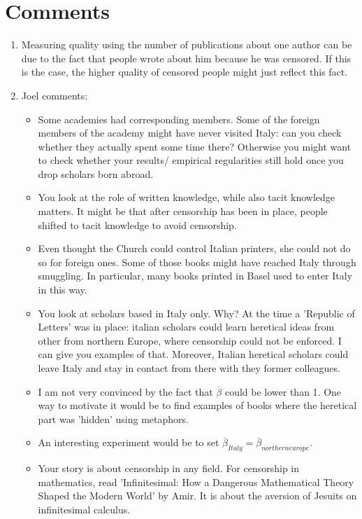 \section{Comments}
\begin{enumerate}
	\item Measuring quality using the number of publications about one author can be due to the fact that people wrote about him because he was censored. If this is the case, the higher quality of censored people might just reflect this fact.
	\item Joel comments:
	
	\begin{itemize}
		
		
		
		\item Some academies had corresponding members. Some of the foreign members of the academy might have never visited Italy: can you check whether they actually spent some time there? Otherwise you might want to check whether your results/ empirical regularities still hold once you drop scholars born abroad.
		\item You look at the role of written knowledge, while also tacit knowledge matters. It might be that after censorship has been in place, people shifted to tacit knowledge to avoid censorship.
		\item Even thought the Church could control Italian printers, she could not do so for foreign ones. Some of those books might have reached Italy through smuggling. In particular, many books printed in Basel used to enter Italy in this way.
		\item You look at scholars based in Italy only. Why? At the time a 'Republic of Letters' was in place: italian scholars could learn heretical ideas from other from northern Europe, where censorship could not be enforced. I can give you examples of that. Moreover, Italian heretical scholars could leave Italy and stay in contact from there with they former colleagues.
		\item I am not very convinced by the fact that $ \overline{\beta}$ could be lower than 1. One way to motivate it would be to find examples of books where the heretical part was 'hidden' using metaphors.
		\item An interesting experiment would be to set $ \overline{\beta}_{Italy}=\overline{\beta}_{northern europe}$.
		\item Your story is about censorship in any field. For censorship in mathematics, read 'Infinitesimal: How a Dangerous Mathematical Theory Shaped the Modern World' by Amir. It is about the aversion of Jesuits on infinitesimal calculus.

\end{itemize}
\end{enumerate}

